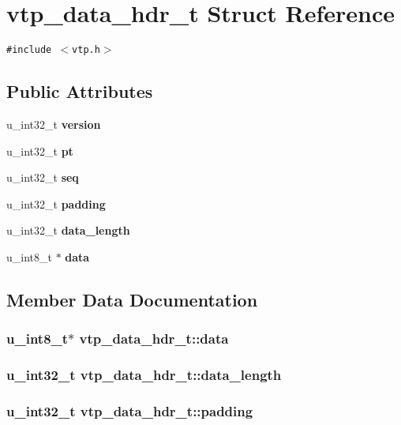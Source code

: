 \section{vtp\_\-data\_\-hdr\_\-t Struct Reference}
\label{structvtp__data__hdr__t}
{\tt \#include $<$vtp.h$>$}

\subsection*{Public Attributes}
\begin{CompactItemize}
\item 
u\_\-int32\_\-t {\bf version}
\item 
u\_\-int32\_\-t {\bf pt}
\item 
u\_\-int32\_\-t {\bf seq}
\item 
u\_\-int32\_\-t {\bf padding}
\item 
u\_\-int32\_\-t {\bf data\_\-length}
\item 
u\_\-int8\_\-t $\ast$ {\bf data}
\end{CompactItemize}


\subsection{Member Data Documentation}
\subsubsection{\setlength{\rightskip}{0pt plus 5cm}u\_\-int8\_\-t$\ast$ {\bf vtp\_\-data\_\-hdr\_\-t::data}}\label{structvtp__data__hdr__t_o5}


\subsubsection{\setlength{\rightskip}{0pt plus 5cm}u\_\-int32\_\-t {\bf vtp\_\-data\_\-hdr\_\-t::data\_\-length}}\label{structvtp__data__hdr__t_o4}


\subsubsection{\setlength{\rightskip}{0pt plus 5cm}u\_\-int32\_\-t {\bf vtp\_\-data\_\-hdr\_\-t::padding}}\label{structvtp__data__hdr__t_o3}


